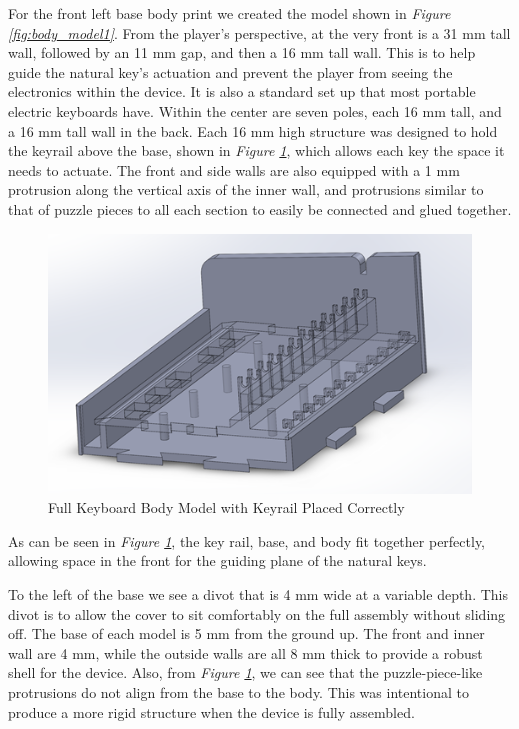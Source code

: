 For the front left base body print we created the model shown in \textit{Figure \ref{fig:body_model1}}. From the player’s perspective, at the very front is a 31 mm tall wall, followed by an 11 mm gap, and then a 16 mm tall wall. This is to help guide the natural key’s actuation and prevent the player from seeing the electronics within the device. It is also a standard set up that most portable electric keyboards have. Within the center are seven poles, each 16 mm tall, and a 16 mm tall wall in the back. Each 16 mm high structure was designed to hold the keyrail above the base, shown in \textit{Figure \ref{fig:body_model2}}, which allows each key the space it needs to actuate. The front and side walls are also equipped with a 1 mm protrusion along the vertical axis of the inner wall, and protrusions similar to that of puzzle pieces to all each section to easily be connected and glued together.

\begin{figure}[h!]
  \centering
  \includegraphics[width=0.8\linewidth]{image/BodyModel2.png}
  \caption{Full Keyboard Body Model with Keyrail Placed Correctly}
  \label{fig:body_model2}
\end{figure}

As can be seen in \textit{Figure \ref{fig:body_model2}}, the key rail, base, and body fit together perfectly, allowing space in the front for the guiding plane of the natural keys.

To the left of the base we see a divot that is 4 mm wide at a variable depth. This divot is to allow the cover to sit comfortably on the full assembly without sliding off. The base of each model is 5 mm from the ground up. The front and inner wall are 4 mm, while the outside walls are all 8 mm thick to provide a robust shell for the device. Also, from \textit{Figure \ref{fig:body_model2}}, we can see that the puzzle-piece-like protrusions do not align from the base to the body. This was intentional to produce a more rigid structure when the device is fully assembled.

